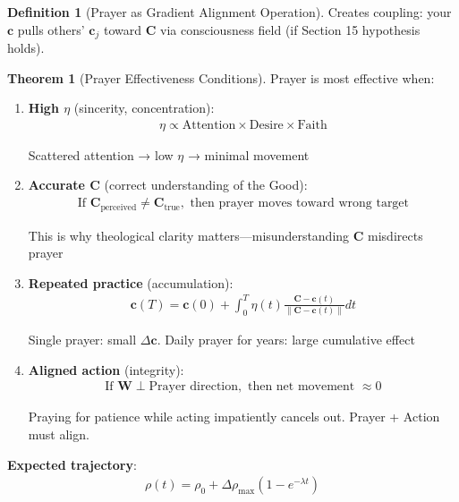 \documentclass[11pt,a4paper]{article}
\theoremstyle{definition}
\newtheorem{definition}{Definition}[section]
\newtheorem{theorem}{Theorem}[section]
\theoremstyle{remark}
\newcommand{\WW}{\mathbf{W}}
\newcommand{\cc}{\mathbf{c}}
\begin{document}
\begin{enumerate}
\begin{protocol}
\begin{definition}[Prayer as Gradient Alignment Operation]
Creates coupling: your \(\cc\) pulls others' \(\cc_j\) toward \(\mathbf{C}\) via consciousness field (if Section 15 hypothesis holds).
\end{definition}

\begin{theorem}[Prayer Effectiveness Conditions]
Prayer is most effective when:

\begin{enumerate}
    \item \textbf{High \(\eta\)} (sincerity, concentration):
        \begin{align}
        \eta \propto \text{Attention} \times \text{Desire} \times \text{Faith}
        \end{align}
        
        Scattered attention → low \(\eta\) → minimal movement
    
    \item \textbf{Accurate \(\mathbf{C}\)} (correct understanding of the Good):
        \begin{align}
        \text{If } \mathbf{C}_{\text{perceived}} \neq \mathbf{C}_{\text{true}}, \text{ then prayer moves toward wrong target}
        \end{align}
        
        This is why theological clarity matters—misunderstanding \(\mathbf{C}\) misdirects prayer
    
    \item \textbf{Repeated practice} (accumulation):
        \begin{align}
        \cc(T) = \cc(0) + \int_0^T \eta(t) \frac{\mathbf{C} - \cc(t)}{\|\mathbf{C} - \cc(t)\|} dt
        \end{align}
        
        Single prayer: small \(\Delta\cc\). Daily prayer for years: large cumulative effect
    
    \item \textbf{Aligned action} (integrity):
        \begin{align}
        \text{If } \WW \perp \text{Prayer direction}, \text{ then net movement } \approx 0
        \end{align}
        
        Praying for patience while acting impatiently cancels out. Prayer + Action must align.
\end{enumerate}

\textbf{Expected trajectory}:
\begin{align}
\rho(t) = \rho_0 + \Delta\rho_{\max}(1 - e^{-\lambda t})
\end{align}


\end{theorem}
\end{protocol}
\end{enumerate}
\end{document}
